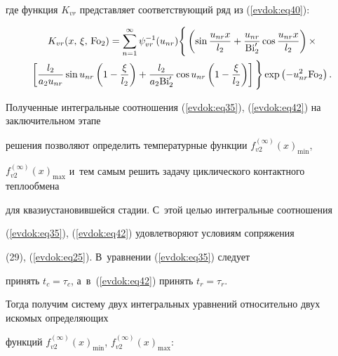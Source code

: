 где функция $K_{vr} $ представляет соответствующий ряд из (\ref{evdok:eq40}):

\begin{multline*}

 K_{vr} (x,\, \xi,\, {\rm Fo}_2)=

\sum\limits_{n = 1}^\infty 

\psi _{vr}^{ - 1} (u_{nr} )

\Bigg\{ 

\left( \sin \frac{u_{nr} x}{l_2 } + \frac{u_{nr} }{{\rm Bi}'_2 }

\cos \frac{u_{nr} x}{l_2} \right)\times 

\\

\left[ \frac{l_2 }{a_2 u_{nr} }\sin u_{nr} 

\left( 1 - \frac{\xi }{l_2 }\right) + 

\frac{l_2 }{a_2 {\rm Bi}'_2}\cos u_{nr} 

\left( 1 - \frac{\xi }{l_2 }\right) 

\right]\Bigg\} \exp \left(  - u_{nr}^2 {\rm Fo}_2  \right).

\end{multline*}







Полученные интегральные соотношения (\ref{evdok:eq35}), (\ref{evdok:eq42}) на заключительном этапе 

решения позволяют определить температурные функции $f_{v2}^{(\infty )} (x)_{\min }$, 

$f_{v2}^{(\infty )} (x)_{\max } $ и~тем самым решить задачу циклического контактного теплообмена 

для квазиустановившейся стадии. С~этой целью интегральные соотношения 

(\ref{evdok:eq35}), (\ref{evdok:eq42}) удовлетворяют условиям сопряжения 

(29), (\ref{evdok:eq25}). В~уравнении (\ref{evdok:eq35}) следует 

принять $t_c = \tau _c $, а~в~(\ref{evdok:eq42}) принять $t_r = \tau _r $. 

Тогда получим систему двух интегральных уравнений относительно двух искомых определяющих 

функций $f_{v2}^{(\infty )} (x)_{\min }$, $f_{v2}^{(\infty )} (x)_{\max } $:


